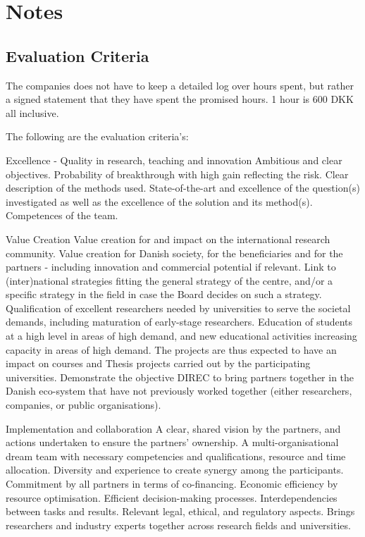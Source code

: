 \documentclass[fleqn,12pt]{article}
\begin{document}
\newpage
\newpage
\small

%


\newpage

\section{Notes}

\subsection{Evaluation Criteria}


The companies does not have to keep a detailed log over hours spent, but rather a signed statement that they have spent the promised hours. 1 hour is 600 DKK all inclusive.


The following are the evaluation criteria's:

Excellence - Quality in research, teaching and innovation
 Ambitious and clear objectives.
 Probability of breakthrough with high gain reflecting the risk.
 Clear description of the methods used.
 State-of-the-art and excellence of the question(s) investigated as well as the excellence of the solution and its method(s).
 Competences of the team.

Value Creation
 Value creation for and impact on the international research community.
 Value creation for Danish society, for the beneficiaries and for the partners - including innovation and
commercial potential if relevant.
 Link to (inter)national strategies fitting the general strategy of the centre, and/or a specific strategy in the field in case the Board decides on such a strategy.
 Qualification of excellent researchers needed by universities to serve the societal demands, including maturation of early-stage researchers.
 Education of students at a high level in areas of high demand, and new educational activities increasing capacity in areas of high demand. The projects are thus expected to have an impact on courses and Thesis projects carried out by the participating universities.
 Demonstrate the objective DIREC to bring partners together in the Danish eco-system that have not previously worked together (either researchers, companies, or public organisations).

Implementation and collaboration
 A clear, shared vision by the partners, and actions undertaken to ensure the partners' ownership.
 A multi-organisational dream team with necessary competencies and qualifications, resource and time
allocation. Diversity and experience to create synergy among the participants.
 Commitment by all partners in terms of co-financing.
 Economic efficiency by resource optimisation. Efficient decision-making processes. Interdependencies between tasks and results.
 Relevant legal, ethical, and regulatory aspects.
 Brings researchers and industry experts together across research fields and universities.
 
\end{document}
